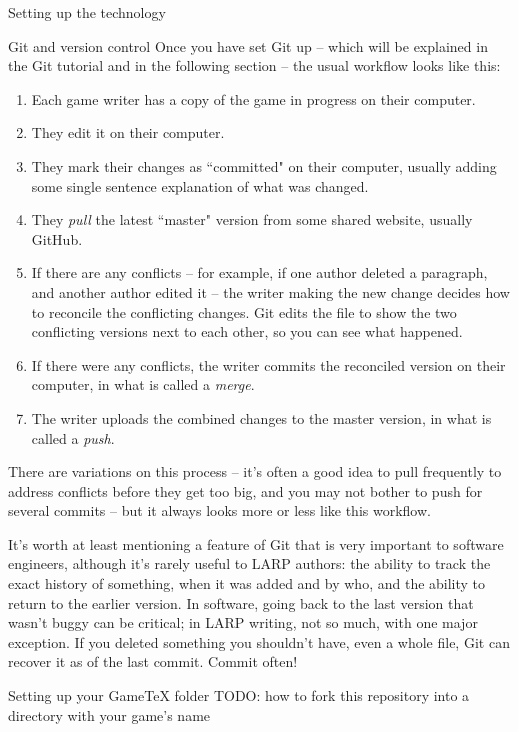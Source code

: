\documentclass{article}
\newcommand{\gametex}{GameTeX}
\begin{document}
\begin{section}{Setting up the technology}
\begin{subsection}{Git and version control}
Once you have set Git up -- which will be explained in the Git tutorial and in the following section -- the usual workflow looks like this:
\begin{enumerate}
\item Each game writer has a copy of the game in progress on their computer.
\item They edit it on their computer.
\item They mark their changes as ``committed" on their computer, usually adding some single sentence explanation of what was changed.
\item They \textit{pull} the latest ``master" version from some shared website, usually GitHub.  
\item If there are any conflicts – for example, if one author deleted a paragraph, and another author edited it – the writer making the new change decides how to reconcile the conflicting changes.  Git edits the file to show the two conflicting versions next to each other, so you can see what happened.
\item If there were any conflicts, the writer commits the reconciled version on their computer, in what is called a \textit{merge}.
\item The writer uploads the combined changes to the master version, in what is called a \textit{push}.
\end{enumerate}

There are variations on this process -- it's often a good idea to pull frequently to address conflicts before they get too big, and you may not bother to push for several commits -- but it always looks more or less like this workflow.

It's worth at least mentioning a feature of Git that is very important to software engineers, although it's rarely useful to LARP authors: the ability to track the exact history of something, when it was added and by who, and the ability to return to the earlier version.  In software, going back to the last version that wasn't buggy can be critical; in LARP writing, not so much, with one major exception.  If you deleted something you shouldn't have, even a whole file, Git can recover it as of the last commit.  Commit often!
\end{subsection}
\begin{subsection}{Setting up your \gametex{} folder}
TODO: how to fork this repository into a directory with your game's name
\end{subsection}
\end{section}
\end{document}
